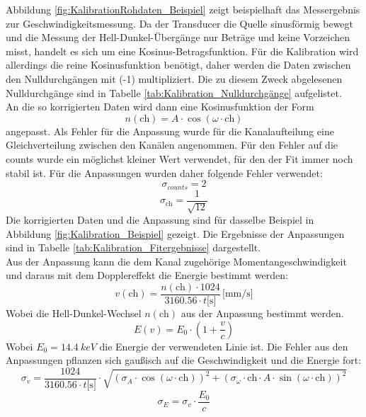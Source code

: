 \documentclass[12pt,a4paper]{article}
\begin{document}
Abbildung \ref{fig:KalibrationRohdaten_Beispiel} zeigt beispielhaft das Messergebnis zur Geschwindigkeitsmessung. Da der Transducer die Quelle sinusförmig bewegt und die Messung der Hell-Dunkel-Übergänge nur Beträge und keine Vorzeichen misst, handelt es sich um eine Kosinus-Betragsfunktion. Für die Kalibration wird allerdings die reine Kosinusfunktion benötigt, daher werden die Daten zwischen den Nulldurchgängen mit (-1) multipliziert. Die zu diesem Zweck abgelesenen Nulldurchgänge sind in Tabelle \ref{tab:Kalibration_Nulldurchgänge} aufgelistet. \\
An die so korrigierten Daten wird dann eine Kosinusfunktion der Form
\begin{equation*}
n(\textrm{ch}) = A \cdot \cos (\omega \cdot \textrm{ch})
\end{equation*}
angepasst. Als Fehler für die Anpassung wurde für die Kanalaufteilung eine Gleichverteilung zwischen den Kanälen angenommen. Für den Fehler auf die counts wurde ein möglichst kleiner Wert verwendet, für den der Fit immer noch stabil ist. Für die Anpassungen wurden daher folgende Fehler verwendet:
\begin{equation*}
\sigma _{counts} = 2
\end{equation*}
\begin{equation*}
\sigma _\textrm{ch} = \dfrac{1}{\sqrt{12}}
\end{equation*}
Die korrigierten Daten und die Anpassung sind für dasselbe Beispiel in Abbildung \ref{fig:Kalibration_Beispiel} gezeigt. Die Ergebnisse der Anpassungen sind in Tabelle \ref{tab:Kalibration_Fitergebnisse} dargestellt. \\
Aus der Anpassung kann die dem Kanal zugehörige Momentangeschwindigkeit und daraus mit dem Dopplereffekt die Energie bestimmt werden:
\begin{equation*}
v(\textrm{ch}) = \dfrac{n(\textrm{ch}) \cdot 1024}{3160.56 \cdot t \textrm{[s]}} \, \textrm{[mm/s]}
\end{equation*}
Wobei die Hell-Dunkel-Wechsel $n(\textrm{ch})$ aus der Anpassung bestimmt werden.
\begin{equation*}
E(v) = E_0 \cdot \left(1 + \dfrac{v}{c}\right)
\end{equation*}
Wobei $E_0 = \SI{14,4}{keV}$ die Energie der verwendeten Linie ist. Die Fehler aus den Anpassungen pflanzen sich gaußisch auf die Geschwindigkeit und die Energie fort:
\begin{equation*}
\sigma _v = \dfrac{1024}{3160.56 \cdot t \textrm{[s]}} \cdot \sqrt{\left( \sigma _A \cdot \cos (\omega \cdot \textrm{ch}) \right)^2 + \left( \sigma _\omega \cdot \textrm{ch} \cdot A \cdot \sin (\omega \cdot \textrm{ch}) \right)^2}
\end{equation*}
\begin{equation}
\sigma _E = \sigma _v \cdot \dfrac{E_0}{c}
\end{equation}
\end{document}
